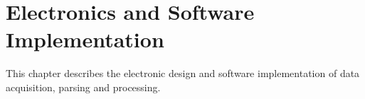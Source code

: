 \chapter{Electronics and Software Implementation}
This chapter describes the electronic design and software implementation of data acquisition, parsing and processing.


